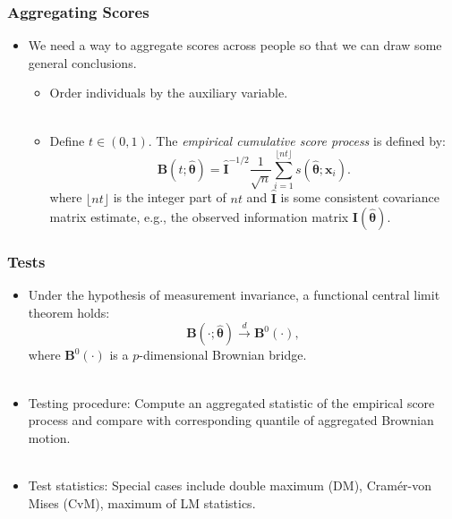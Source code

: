 \documentclass{beamer}
\begin{document}
\begin{frame}[fragile]
  \frametitle{Aggregating Scores}
  \begin{itemize}
    \item We need a way to aggregate scores across people so that we
      can draw some general conclusions.
      \begin{itemize}
        \item Order individuals by the auxiliary variable.\\ \ \\
        \item Define $t \in (0, 1)$.
          The {\em empirical cumulative score process} is defined by:\\
  \begin{equation*}
    \bm{B}(t; \hat{\bm{\theta}}) = 
      {\bm{\widehat I}}^{-1/2} \frac{1}{\sqrt{n}}
    \displaystyle\sum_{i=1}^{\lfloor nt 
      \rfloor} s(\hat{\bm{\theta}} ; \bm{x}_i).
    \end{equation*}
  where $\lfloor nt \rfloor$ is the integer part of $nt$
  and $\bm{\widehat I}$ is some consistent covariance matrix estimate, e.g.,
  the observed information matrix ${\bm{I}}(\widehat{{\bm{\theta}}})$.

      \end{itemize}
  \end{itemize}
\end{frame}


\begin{frame}[fragile]
  \frametitle{Tests}
  \begin{itemize}
    \item Under the hypothesis of
      measurement invariance, a functional central limit
      theorem holds:
  \begin{equation*}
  {\bm{B}}(\cdot; \widehat{{\bm{\theta}}}) \overset{d}{\rightarrow} {\bm B}^{0}(\cdot),
  \end{equation*}
 where ${\bm B}^{0}(\cdot)$ is a $p$-dimensional Brownian bridge.\\ \ \\

   \item Testing procedure: Compute an aggregated statistic of the empirical
     score process and compare with corresponding quantile of aggregated
     Brownian motion.\\ \ \\

    \item Test statistics: Special cases include double maximum (DM), Cram\'er-von Mises
      (CvM), maximum of LM statistics.
  \end{itemize}
\end{frame}
\end{document}
